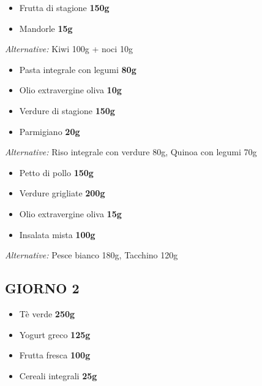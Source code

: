 \documentclass[11pt,a4paper]{article}
\begin{document}
\begin{tcolorbox}[colback=lightgray,colframe=accentcolor,boxrule=1pt,arc=3pt,title=\textbf{MERENDA MATTUTINA (10:00-11:00)}]
\begin{itemize}[leftmargin=*,itemsep=0pt]
\item Frutta di stagione \textbf{150g}
\item Mandorle \textbf{15g}
\end{itemize}

\textit{Alternative:} Kiwi 100g + noci 10g
\end{tcolorbox}

\begin{tcolorbox}[colback=lightgray,colframe=accentcolor,boxrule=1pt,arc=3pt,title=\textbf{PRANZO (13:00)}]
\begin{itemize}[leftmargin=*,itemsep=0pt]
\item Pasta integrale con legumi \textbf{80g}
\item Olio extravergine oliva \textbf{10g}
\item Verdure di stagione \textbf{150g}
\item Parmigiano \textbf{20g}
\end{itemize}

\textit{Alternative:} Riso integrale con verdure 80g, Quinoa con legumi 70g
\end{tcolorbox}

\begin{tcolorbox}[colback=lightgray,colframe=accentcolor,boxrule=1pt,arc=3pt,title=\textbf{CENA (20:00-21:30)}]
\begin{itemize}[leftmargin=*,itemsep=0pt]
\item Petto di pollo \textbf{150g}
\item Verdure grigliate \textbf{200g}
\item Olio extravergine oliva \textbf{15g}
\item Insalata mista \textbf{100g}
\end{itemize}

\textit{Alternative:} Pesce bianco 180g, Tacchino 120g
\end{tcolorbox}

\newpage

\subsection{GIORNO 2}

\begin{tcolorbox}[colback=lightgray,colframe=accentcolor,boxrule=1pt,arc=3pt,title=\textbf{COLAZIONE}]
\begin{itemize}[leftmargin=*,itemsep=0pt]
\item Tè verde \textbf{250g}
\item Yogurt greco \textbf{125g}
\item Frutta fresca \textbf{100g}
\item Cereali integrali \textbf{25g}
\end{itemize}
\end{tcolorbox}
\end{document}
